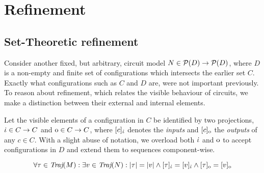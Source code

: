 \section{Refinement}

\subsection{Set-Theoretic refinement}

Consider another fixed, but arbitrary, circuit model $N \in \mathcal{P}(D) \rightarrow \mathcal{P}(D)$, where $D$ is a non-empty and finite set of configurations which intersects the earlier set $C$. Exactly what configurations such as $C$ and $D$ are, were not important previously. To reason about refinement, which relates the visible behaviour of circuits, we make a distinction between their external and internal elements.


Let the visible elements of a configuration in $C$ be identified by two projections, $\dot{\iota} \in C \rightarrow C$ and $\mathrm{o} \in C \rightarrow C$, where $[c]_{\dot{\iota}}$ denotes the \textit{inputs} and $[c]_{\mathrm{o}}$ the \textit{outputs} of any $c \in C$. With a slight abuse of notation, we overload both $\dot{\iota}$ and $\mathrm{o}$ to accept configurations in $D$ and extend them to sequences component-wise. 


\begin{equation*}
\forall \tau \in \operatorname{\textit{Traj}}(M) : \exists v \in \operatorname{\textit{Traj}}(N) : | \tau | = | v | \wedge [\tau]_{\dot{\iota}} = [v]_{\dot{\iota}} \wedge [\tau]_{\mathrm{o}} = [v]_{\mathrm{o}}
\end{equation*}

